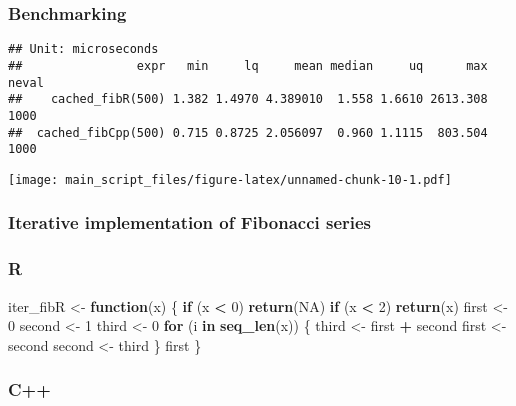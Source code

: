 \documentclass[]{article}
\newenvironment{Shaded}{\begin{snugshade}}{\end{snugshade}}
\newcommand{\KeywordTok}[1]{\textcolor[rgb]{0.13,0.29,0.53}{\textbf{#1}}}
\newcommand{\DecValTok}[1]{\textcolor[rgb]{0.00,0.00,0.81}{#1}}
\newcommand{\StringTok}[1]{\textcolor[rgb]{0.31,0.60,0.02}{#1}}
\newcommand{\OtherTok}[1]{\textcolor[rgb]{0.56,0.35,0.01}{#1}}
\newcommand{\ControlFlowTok}[1]{\textcolor[rgb]{0.13,0.29,0.53}{\textbf{#1}}}
\newcommand{\OperatorTok}[1]{\textcolor[rgb]{0.81,0.36,0.00}{\textbf{#1}}}
\newcommand{\NormalTok}[1]{#1}
\begin{document}
\newpage

\subsubsection{Benchmarking}\label{benchmarking-1}

\begin{verbatim}
## Unit: microseconds
##                expr   min     lq     mean median     uq      max neval
##    cached_fibR(500) 1.382 1.4970 4.389010  1.558 1.6610 2613.308  1000
##  cached_fibCpp(500) 0.715 0.8725 2.056097  0.960 1.1115  803.504  1000
\end{verbatim}

\texttt{[image: main\_script\_files/figure-latex/unnamed-chunk-10-1.pdf]}

\newpage

\subsubsection{Iterative implementation of Fibonacci
series}\label{iterative-implementation-of-fibonacci-series}

\subsubsection{R}\label{r-2}

\begin{Shaded}
\begin{Highlighting}[]
\NormalTok{iter_fibR <-}\StringTok{ }\ControlFlowTok{function}\NormalTok{(x) \{}
  \ControlFlowTok{if}\NormalTok{ (x }\OperatorTok{<}\StringTok{ }\DecValTok{0}\NormalTok{) }\KeywordTok{return}\NormalTok{(}\OtherTok{NA}\NormalTok{)}
  \ControlFlowTok{if}\NormalTok{ (x }\OperatorTok{<}\StringTok{ }\DecValTok{2}\NormalTok{) }\KeywordTok{return}\NormalTok{(x)}
\NormalTok{  first <-}\StringTok{ }\DecValTok{0}
\NormalTok{  second <-}\StringTok{ }\DecValTok{1}
\NormalTok{  third <-}\StringTok{ }\DecValTok{0}
  \ControlFlowTok{for}\NormalTok{ (i }\ControlFlowTok{in} \KeywordTok{seq_len}\NormalTok{(x)) \{}
\NormalTok{    third <-}\StringTok{ }\NormalTok{first }\OperatorTok{+}\StringTok{ }\NormalTok{second}
\NormalTok{    first <-}\StringTok{ }\NormalTok{second}
\NormalTok{    second <-}\StringTok{ }\NormalTok{third}
\NormalTok{  \}}
\NormalTok{  first}
\NormalTok{\}}
\end{Highlighting}
\end{Shaded}

\subsubsection{C++}\label{c-2}
\end{document}
